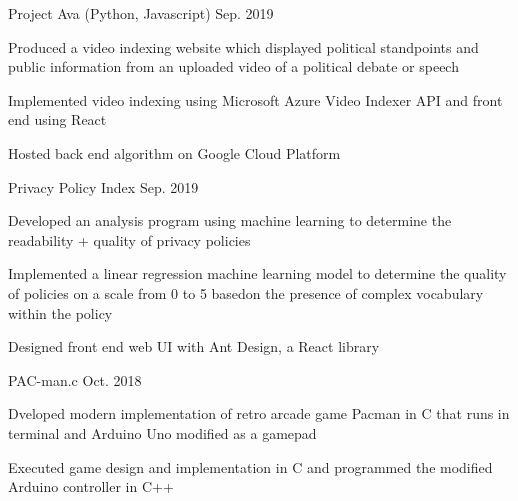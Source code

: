 

\begin{cventries}

  \cventry
    {Project Ava (Python, Javascript)} %
    {}
    {}
    {Sep. 2019} %
    {
      \begin{cvitems} %
        \item {Produced a video indexing website which displayed political standpoints and public information from an uploaded video of a political debate or speech}
        \item {Implemented video indexing using Microsoft Azure Video Indexer API and front end using React}
        \item {Hosted back end algorithm on Google Cloud Platform}
      \end{cvitems}
    }

  \cventry
    {Privacy Policy Index} %
    {}
    {}
    {Sep. 2019} %
    {
      \begin{cvitems} %
        \item {Developed an analysis program using machine learning to determine the readability + quality of privacy policies}
        \item {Implemented a linear regression machine learning model to determine the quality of policies on a scale from 0 to 5 basedon the presence of complex vocabulary within the policy}
        \item {Designed front end web UI with Ant Design, a React library}
      \end{cvitems}
    }

  \cventry
  {PAC-man.c} %
  {} %
  {}
  {Oct. 2018}
  {
    \begin{cvitems} %
      \item {Dveloped modern implementation of retro arcade game Pacman in C that runs in terminal and Arduino Uno modified as a gamepad}
      \item {Executed game design and implementation in C and programmed the modified Arduino controller in C++}
    \end{cvitems}
  }


\end{cventries}
